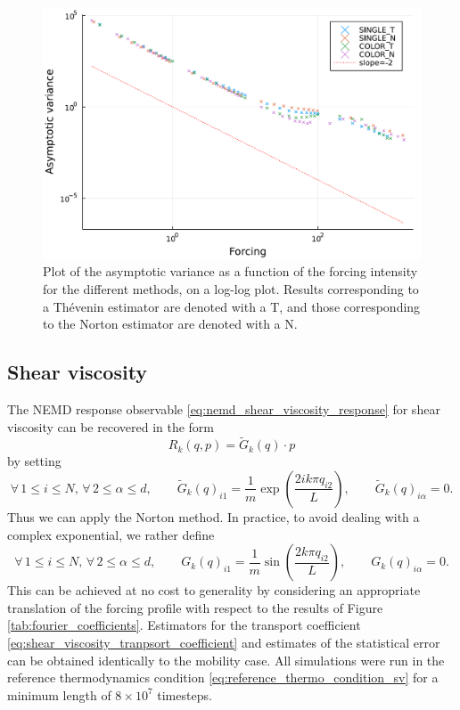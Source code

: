   \begin{figure}[htbp]
    \begin{center}
      \includegraphics[width=0.7\linewidth]{figures/asymptotic_vars_mobility.pdf}
      \caption{ \label{fig:norton_avs}
       Plot of the asymptotic variance as a function of the forcing intensity for the different methods, on a log-log plot.
       Results corresponding to a Thévenin estimator are denoted with a T, and those corresponding to the Norton estimator are denoted with a N. 
      }
    \end{center}
  \end{figure}

\subsection{Shear viscosity}
The NEMD response observable \eqref{eq:nemd_shear_viscosity_response} for shear viscosity can be recovered in the form 
\[R_k(q,p)= \widetilde{G}_k(q)\cdot p\]
 by setting
\begin{equation}
    \label{eq:shear_viscosity_response_alt}
    \forall\, 1\leq i\leq N,\,\forall\, 2\leq \alpha\leq d,\qquad \widetilde{G}_k(q)_{i1}=\frac{1}{m}\exp\left(\frac{2ik\pi q_{i2}}{L}\right),\qquad \widetilde{G}_k(q)_{i\alpha}=0.
\end{equation}
Thus we can apply the Norton method. In practice, to avoid dealing with a complex exponential, we rather define
\begin{equation}
    \label{eq:shear_viscosity_response}
    \forall\, 1\leq i\leq N,\,\forall\, 2\leq \alpha\leq d,\qquad G_k(q)_{i1}=\frac{1}{m}\sin\left(\frac{2k\pi q_{i2}}{L}\right),\qquad G_k(q)_{i\alpha}=0.
\end{equation}
This can be achieved at no cost to generality by considering an appropriate translation of the forcing profile with respect to the results of Figure \ref{tab:fourier_coefficients}.
Estimators for the transport coefficient \eqref{eq:shear_viscosity_tranpsort_coefficient} and estimates of the statistical error can be obtained identically to the mobility case.
All simulations were run in the reference thermodynamics condition \eqref{eq:reference_thermo_condition_sv} for a minimum length of $8\times 10^7$ timesteps.

